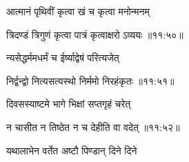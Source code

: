 {\devanagarifont आत्मानं पृथिवीं कृत्वा खं च कृत्वा मनोन्मनम् \thinspace{\dandab} \dontdisplaylinenum }%


{\devanagarifont त्रिदण्डं त्रिगुणं कृत्वा पात्रं कृत्वाक्षरो ऽव्ययः {॥११:५०॥} \veg\dontdisplaylinenum }%

{\devanagarifont न्यसेद्धर्ममधर्मं च ईर्ष्याद्वेषं परित्यजेत् \thinspace{\dandab} \dontdisplaylinenum }%


{\devanagarifont निर्द्वन्द्वो नित्यसत्यस्थो निर्ममो निरहंकृतः {॥११:५१॥} \veg\dontdisplaylinenum }%

{\devanagarifont दिवसस्याष्टमे भागे भिक्षां सप्तगृहं चरेत् \thinspace{\dandab} \dontdisplaylinenum }%


{\devanagarifont न चासीत न तिष्ठेत न च देहीति वा वदेत् {॥११:५२॥} \veg\dontdisplaylinenum }%
 
{\devanagarifont यथालाभेन वर्तेत अष्टौ पिण्डान् दिने दिने \thinspace{\dandab} \dontdisplaylinenum }%

